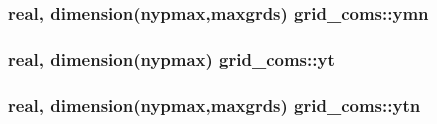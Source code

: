 \subsubsection[{\texorpdfstring{ymn}{ymn}}]{\setlength{\rightskip}{0pt plus 5cm}real, dimension(nypmax,maxgrds) grid\+\_\+coms\+::ymn}\hypertarget{namespacegrid__coms_ac86adbc4cb710451d5b9ae53178a756b}{}\label{namespacegrid__coms_ac86adbc4cb710451d5b9ae53178a756b}
\subsubsection[{\texorpdfstring{yt}{yt}}]{\setlength{\rightskip}{0pt plus 5cm}real, dimension(nypmax) grid\+\_\+coms\+::yt}\hypertarget{namespacegrid__coms_a24ff2ae7949aa76dc0d798ef5baa5aab}{}\label{namespacegrid__coms_a24ff2ae7949aa76dc0d798ef5baa5aab}
\subsubsection[{\texorpdfstring{ytn}{ytn}}]{\setlength{\rightskip}{0pt plus 5cm}real, dimension(nypmax,maxgrds) grid\+\_\+coms\+::ytn}\hypertarget{namespacegrid__coms_aa853f8064bf96a5159ba89902bf37efb}{}\label{namespacegrid__coms_aa853f8064bf96a5159ba89902bf37efb}
